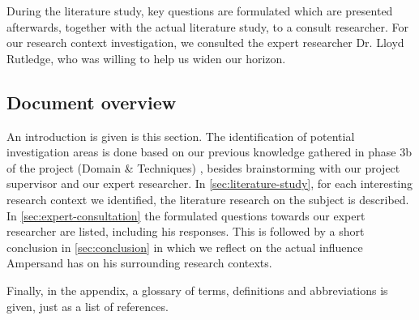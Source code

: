 During the literature study, key questions are formulated which are presented afterwards, together with the actual literature study, to a consult researcher.
For our research context investigation, we consulted the expert researcher Dr. Lloyd Rutledge, who was willing to help us widen our horizon.


\subsection{Document overview}
An introduction is given is this section.
The identification of potential investigation areas is done based on our previous knowledge gathered in phase 3b of the project (Domain \& Techniques) , besides brainstorming with our project supervisor and our expert researcher.
In \autoref{sec:literature-study}, for each interesting research context we identified, the literature research on the subject is described.
In \autoref{sec:expert-consultation} the formulated questions towards our expert researcher are listed, including his responses.
This is followed by a short conclusion in \autoref{sec:conclusion} in which we reflect on the actual influence Ampersand has on his surrounding research contexts.

Finally, in the appendix, a glossary of terms, definitions and abbreviations is given, just as a list of references.
